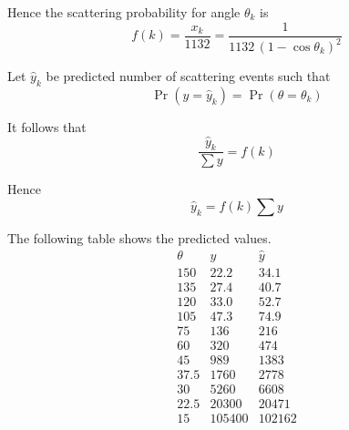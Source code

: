 Hence the scattering probability for angle $\theta_k$ is
\begin{equation*}
f(k)=\frac{x_k}{1132}=\frac{1}{1132\,(1-\cos\theta_k)^2}
\end{equation*}

Let $\hat y_k$ be predicted number of scattering events such that
\begin{equation*}
\Pr(y=\hat y_k)=\Pr(\theta=\theta_k)
\end{equation*}

It follows that
\begin{equation*}
\frac{\hat y_k}{\sum y}=f(k)
\end{equation*}

Hence
\begin{equation*}
\hat y_k=f(k)\sum y
\end{equation*}

The following table shows the predicted values.
\begin{equation*}
\begin{matrix}
\theta & y & \hat y\\
150 & 22.2 & 34.1\\
135 & 27.4 & 40.7\\
120 & 33.0 & 52.7\\
105 & 47.3 & 74.9\\
75 & 136 & 216\\
60 & 320 & 474\\
45 & 989 & 1383\\
37.5 & 1760 & 2778\\
30 & 5260 & 6608\\
22.5 & 20300 & 20471\\
15 & 105400 & 102162
\end{matrix}
\end{equation*}

\iffalse

The coefficient of determination $R^2$ measures how well predicted values fit the data.
\begin{equation*}
R^2=1-\frac{\sum (y-\hat y)^2}{\sum (y-\bar y)^2}=0.998
\end{equation*}

The result indicates that $d\sigma$ explains 99.8\%
of the variance in the data.

\fi


